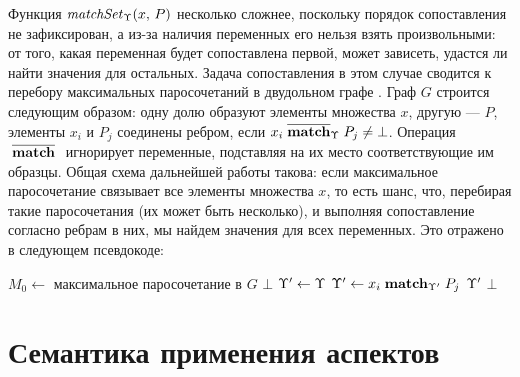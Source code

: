 Функция $\matchSet{\ME}{x}{P}$ несколько сложнее, поскольку порядок сопоставления не зафиксирован, а из-за наличия переменных его нельзя взять произвольными: от того, какая переменная будет сопоставлена первой, может зависеть, удастся ли найти значения для остальных. Задача сопоставления в этом случае сводится к перебору максимальных паросочетаний в двудольном графе \cite{Cormen}. Граф $G$ строится следующим образом: одну долю образуют элементы множества $x$, другую --- $P$, элементы $x_i$ и $P_j$ соединены ребром, если $\matchNV[\ME]{x_i}{P_j} \neq \bot$. Операция $\matchNV{}{}$ игнорирует переменные, подставляя на их место соответствующие им образцы. Общая схема дальнейшей работы такова: если максимальное паросочетание связывает все элементы множества $x$, то есть шанс, что, перебирая такие паросочетания (их может быть несколько), и выполняя сопоставление согласно ребрам в них, мы найдем значения для всех переменных. Это отражено в следующем псевдокоде:
%
\newcommand{\matchM}[2]{\mathsf{matchM}(#1,\, #2)}%
%
\begin{algorithmic}
\STATE $M_0 \gets$ максимальное паросочетание в $G$
	\RETURN $\bot$
\ENDIF
{}
	\STATE{}
	\STATE $\ME' \gets \ME$
	\STATE{}
		\STATE $\ME' \gets \match[\ME']{x_i}{P_j}$
	\ENDFOR
		\RETURN $\ME'$ 
	\ENDIF
\ENDFOR
\RETURN $\bot$
\end{algorithmic}



\section{Семантика применения аспектов}

